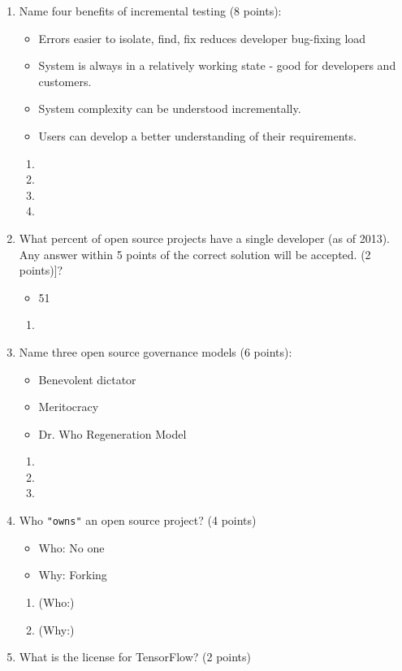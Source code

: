 \documentclass[10pt]{article}
\begin{document}
\begin{enumerate}
\begin{enumerate}
\item Name four benefits of incremental testing (8 points):
\beginanswers
\begin{itemize}
	\item Errors easier to isolate, find, fix reduces developer bug-fixing load
	\item System is always in a relatively working state - good for developers and customers.
	\item System complexity can be understood incrementally.
	\item Users can develop a better understanding of their requirements.
\end{itemize}
\else
\begin{enumerate}
	\item 
	\bigskip
	\bigskip
	\item
	\bigskip
	\bigskip
	\item 
	\bigskip
	\bigskip
	\item 
\bigskip
\bigskip
\end{enumerate}
\fi
\bigskip
\bigskip
\item What percent of open source projects have a single developer (as of 2013). Any answer within 5 points of the correct solution will be accepted. (2 points)]?
\beginanswers
\begin{itemize}
	\item 51%
\end{itemize}
\else
\begin{enumerate}
	\item
	\bigskip
	\bigskip
\end{enumerate}
\fi
\bigskip
\bigskip
\item Name three open source governance models (6 points):
\beginanswers
\begin{itemize}
	\item Benevolent dictator
	\item Meritocracy
	\item Dr. Who Regeneration Model
\end{itemize}
\else
\begin{enumerate}
	\item 
	\bigskip
	\bigskip
	\item
	\bigskip
	\bigskip
	\item 
	\bigskip
	\bigskip
\end{enumerate}
\fi
\bigskip
\bigskip
\item Who \verb|"owns"| an open source project? (4 points)
\beginanswers
\begin{itemize}
	\item Who: No one
	\item Why: Forking
	\end{itemize}
\else
\begin{enumerate}
	\item (Who:)
	\bigskip
	\bigskip
	\bigskip
	\bigskip
	\item (Why:)
	\bigskip
	\bigskip
	\bigskip
	\bigskip
	\end{enumerate}
\fi
	\bigskip
\bigskip
\item What is the license for TensorFlow? (2 points)


\end{enumerate}
\end{enumerate}
\end{document}
